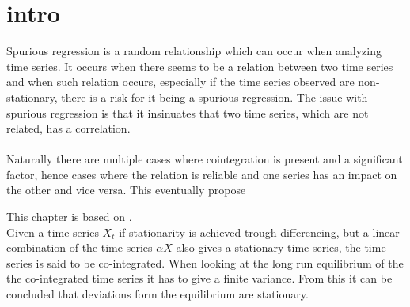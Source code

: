 \chapter{intro}
Spurious regression is a random relationship which can occur when analyzing time series. It occurs when there seems to be a relation between two time series and when such relation occurs, especially if the time series observed are non-stationary, there is a risk for it being a spurious regression. The issue with spurious regression is that it insinuates that two time series, which are not related, has a correlation.\\\\
Naturally there are multiple cases where cointegration is present and a significant factor, hence cases where the relation is reliable and one series has an impact on the other and vice versa. This eventually propose 

This chapter is based on \cite{co-Integration_and_error_correction}.
\\
Given a time series $X_t$ if stationarity is achieved trough differencing, but a linear combination of the time series $\alpha X$ also gives a stationary time series, the time series is said to be co-integrated. When looking at the long run equilibrium of the the co-integrated time series it has to give a finite variance. From this it can be concluded that deviations form the equilibrium are stationary.
